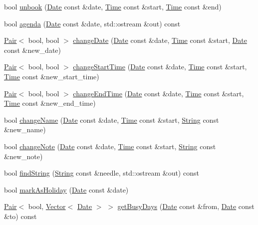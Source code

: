 \begin{DoxyCompactItemize}
\item 
bool \hyperlink{classProgram_a86a0e7e6c345dd50643cc6f466fb965a}{unbook} (\hyperlink{classDate}{Date} const \&date, \hyperlink{classTime}{Time} const \&start, \hyperlink{classTime}{Time} const \&end)
\item 
bool \hyperlink{classProgram_a36916661bfce488ed07dbc2a7f3fadce}{agenda} (\hyperlink{classDate}{Date} const \&date, std\+::ostream \&out) const
\item 
\hyperlink{structPair}{Pair}$<$ bool, bool $>$ \hyperlink{classProgram_a4a25f61fe0747f0f13ace13b310ed7a3}{change\+Date} (\hyperlink{classDate}{Date} const \&date, \hyperlink{classTime}{Time} const \&start, \hyperlink{classDate}{Date} const \&new\+\_\+date)
\item 
\hyperlink{structPair}{Pair}$<$ bool, bool $>$ \hyperlink{classProgram_afb92c7d470233331feb450698ea66531}{change\+Start\+Time} (\hyperlink{classDate}{Date} const \&date, \hyperlink{classTime}{Time} const \&start, \hyperlink{classTime}{Time} const \&new\+\_\+start\+\_\+time)
\item 
\hyperlink{structPair}{Pair}$<$ bool, bool $>$ \hyperlink{classProgram_a8038bf54fd0e358c48d02ced033b6848}{change\+End\+Time} (\hyperlink{classDate}{Date} const \&date, \hyperlink{classTime}{Time} const \&start, \hyperlink{classTime}{Time} const \&new\+\_\+end\+\_\+time)
\item 
bool \hyperlink{classProgram_a606ccb02438885b2894843613d6de157}{change\+Name} (\hyperlink{classDate}{Date} const \&date, \hyperlink{classTime}{Time} const \&start, \hyperlink{classString}{String} const \&new\+\_\+name)
\item 
bool \hyperlink{classProgram_a63f49d8259cb4038274a1cb6e9b82374}{change\+Note} (\hyperlink{classDate}{Date} const \&date, \hyperlink{classTime}{Time} const \&start, \hyperlink{classString}{String} const \&new\+\_\+note)
\item 
bool \hyperlink{classProgram_af80c02ad4f189ee0d6c67ccc7efdc814}{find\+String} (\hyperlink{classString}{String} const \&needle, std\+::ostream \&out) const
\item 
bool \hyperlink{classProgram_ad14086e73ec4aef58c705e3a19089d97}{mark\+As\+Holiday} (\hyperlink{classDate}{Date} const \&date)
\item 
\hyperlink{structPair}{Pair}$<$ bool, \hyperlink{classVector}{Vector}$<$ \hyperlink{classDate}{Date} $>$ $>$ \hyperlink{classProgram_af91512a81cffe079b6c300f47df906e8}{get\+Busy\+Days} (\hyperlink{classDate}{Date} const \&from, \hyperlink{classDate}{Date} const \&to) const

\end{DoxyCompactItemize}
